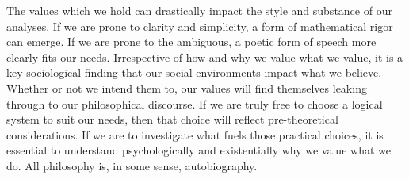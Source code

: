 \documentclass[leqno, 12pt]{turabian-researchpaper}
\begin{document}
	The values which we hold can drastically impact the style and substance of our
	analyses. If we are prone to clarity and simplicity, a form of mathematical
	rigor can emerge. If we are prone to the ambiguous, a poetic form of speech
	more clearly fits our needs. Irrespective of how and why we value what we value,
	it is a key sociological finding that our social environments impact what we
	believe. Whether or not we intend them to, our values will find themselves
	leaking through to our philosophical discourse. If we are truly free to choose
	a logical system to suit our needs, then that choice will reflect pre-theoretical
	considerations. If we are to investigate what fuels those practical choices,
	it is essential to understand psychologically and existentially why we value
	what we do. All philosophy is, in some sense, autobiography.

	\centerline{} \break

	\printbibliography
\end{document}
